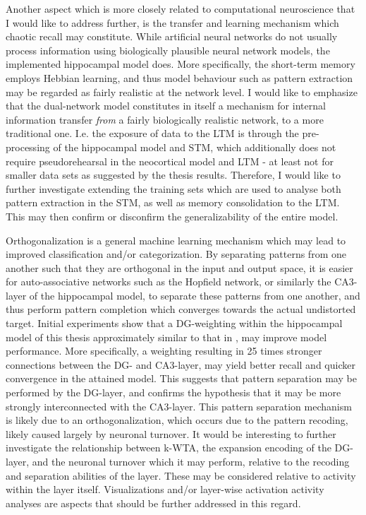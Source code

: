 Another aspect which is more closely related to computational neuroscience that I would like to address further, is the transfer and learning mechanism which chaotic recall may constitute.
While artificial neural networks do not usually process information using biologically plausible neural network models, the implemented hippocampal model does. More specifically, the short-term memory employs Hebbian learning, and thus model behaviour such as pattern extraction may be regarded as fairly realistic at the network level.
I would like to emphasize that the dual-network model constitutes in itself a mechanism for internal information transfer \textit{from} a fairly biologically realistic network, to a more traditional one. I.e. the exposure of data to the LTM is through the pre-processing of the hippocampal model and STM, which additionally does not require pseudorehearsal in the neocortical model and LTM - at least not for smaller data sets as suggested by the thesis results. Therefore, I would like to further investigate extending the training sets which are used to analyse both pattern extraction in the STM, as well as memory consolidation to the LTM. This may then confirm or disconfirm the generalizability of the entire model.

Orthogonalization is a general machine learning mechanism which may lead to improved classification and/or categorization. By separating patterns from one another such that they are orthogonal in the input and output space, it is easier for auto-associative networks such as the Hopfield network, or similarly the CA3-layer of the hippocampal model, to separate these patterns from one another, and thus perform pattern completion which converges towards the actual undistorted target.
Initial experiments show that a DG-weighting within the hippocampal model of this thesis approximately similar to that in \citep{Wakagi2008}, may improve model performance. More specifically, a weighting resulting in 25 times stronger connections between the DG- and CA3-layer, may yield better recall and quicker convergence in the attained model. This suggests that pattern separation may be performed by the DG-layer, and confirms the hypothesis that it may be more strongly interconnected with the CA3-layer. This pattern separation mechanism is likely due to an orthogonalization, which occurs due to the pattern recoding, likely caused largely by neuronal turnover. It would be interesting to further investigate the relationship between k-WTA, the expansion encoding of the DG-layer, and the neuronal turnover which it may perform, relative to the recoding and separation abilities of the layer. These may be considered relative to activity within the layer itself. Visualizations and/or layer-wise activation activity analyses are aspects that should be further addressed in this regard.

